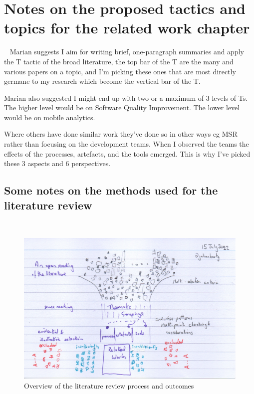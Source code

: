 \section{Notes on the proposed tactics and topics for the related work chapter}~\label{rw-proposed-tactics-and-topics-for-this-chapter}
Marian suggests I aim for writing brief, one-paragraph summaries and apply the T tactic of the broad literature, the top bar of the T are the many and various papers on a topic, and I'm picking these ones that are most directly germane to my research which become the vertical bar of the T. 

Marian also suggested I might end up with two or a maximum of 3 levels of Ts. The higher level would be on Software Quality Improvement. The lower level would be on mobile analytics.

Where others have done similar work they've done so in other ways eg MSR rather than focusing on the development teams. When I observed the teams the effects of the processes, artefacts, and the tools emerged. This is why I've picked these 3 aspects and 6 perspectives. 

\subsection{Some notes on the methods used for the literature review}~\label{rw-notes-on-methods-used-for-literature-review-topic}

\begin{figure}
    \centering
    \includegraphics[width=\textwidth]{images/rough-sketches/literature-review-overview.jpeg}
    \caption{Overview of the literature review process and outcomes}
    \label{fig:literature-review-overview}
\end{figure}

